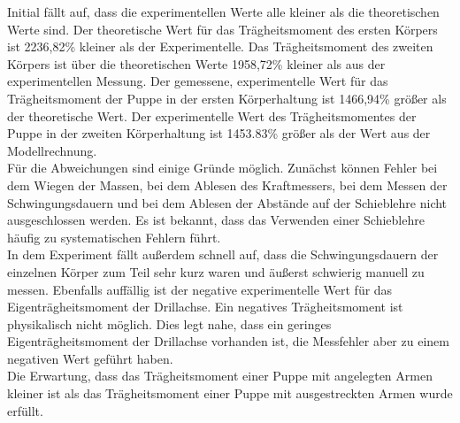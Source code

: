 Initial fällt auf, dass die experimentellen Werte alle kleiner als die theoretischen Werte sind.
Der theoretische Wert für das Trägheitsmoment des ersten Körpers ist 2236,82\% kleiner als der Experimentelle.
Das Trägheitsmoment des zweiten Körpers ist über die theoretischen Werte 1958,72\% kleiner als aus der experimentellen Messung.
Der gemessene, experimentelle Wert für das Trägheitsmoment der Puppe in der ersten Körperhaltung ist 1466,94\% größer als der theoretische Wert.
Der experimentelle Wert des Trägheitsmomentes der Puppe in der zweiten Körperhaltung ist 1453.83\% größer als der Wert aus der Modellrechnung.
\\Für die Abweichungen sind einige Gründe möglich. Zunächst können Fehler bei dem Wiegen der Massen, bei dem Ablesen des Kraftmessers,
bei dem Messen der Schwingungsdauern und bei dem Ablesen der Abstände auf der Schieblehre nicht ausgeschlossen werden.
Es ist bekannt, dass das Verwenden einer Schieblehre häufig zu systematischen Fehlern führt.
\\In dem Experiment fällt außerdem schnell auf, dass die Schwingungsdauern der einzelnen Körper zum Teil sehr kurz waren und äußerst schwierig manuell zu messen.
Ebenfalls auffällig ist der negative experimentelle Wert für das Eigenträgheitsmoment der Drillachse. Ein negatives Trägheitsmoment ist physikalisch nicht möglich.
Dies legt nahe, dass ein geringes Eigenträgheitsmoment der Drillachse vorhanden ist, die Messfehler aber zu einem negativen Wert geführt haben.
\\Die Erwartung, dass das Trägheitsmoment einer Puppe mit angelegten Armen kleiner ist als das Trägheitsmoment einer Puppe mit ausgestreckten Armen wurde erfüllt.
